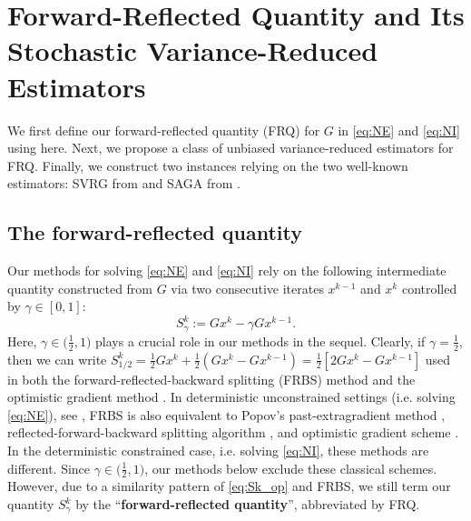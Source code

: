 \documentclass{article}
\newcommand{\beforesec}{\vspace{-1.5ex}}
\newcommand{\aftersec}{\vspace{-1.25ex}}
\newcommand{\beforesubsec}{\vspace{-1.5ex}}
\newcommand{\aftersubsec}{\vspace{-1.5ex}}
\theoremstyle{plain}
\theoremstyle{definition}
\theoremstyle{remark}
\begin{document}
\beforesec
\section{Forward-Reflected Quantity and Its Stochastic Variance-Reduced Estimators}\label{sec:VRS_Estimator}
\aftersec
We first define our forward-reflected quantity (FRQ) for $G$ in \eqref{eq:NE} and \eqref{eq:NI} using here. 
Next, we propose a class of unbiased variance-reduced estimators for FRQ.
Finally, we construct two instances relying on the two well-known estimators: SVRG from \cite{SVRG} and SAGA from \cite{Defazio2014}.

\beforesubsec
\subsection{The forward-reflected quantity}\label{subsec:OG_operator}
\aftersubsec
Our methods for solving \eqref{eq:NE} and \eqref{eq:NI} rely on the following intermediate quantity constructed from $G$ via two consecutive iterates $x^{k-1}$ and $x^k$ controlled by $\gamma \in [0, 1]$:
\begin{equation}\label{eq:Sk_op}
S_{\gamma}^k := Gx^k  - \gamma Gx^{k-1}.
\tag{FRQ}
\end{equation}
Here, $\gamma \in \big(\frac{1}{2}, 1\big)$ plays a crucial role in our methods in the sequel.
Clearly, if $\gamma = \frac{1}{2}$, then we can write $S_{1/2}^k = \frac{1}{2}Gx^k + \frac{1}{2}(Gx^k - Gx^{k-1}) = \frac{1}{2}[ 2Gx^k - Gx^{k-1}]$ used in both the forward-reflected-backward splitting (FRBS) method \citep{malitsky2020forward} and the optimistic gradient method  \citep{daskalakis2018training}.
In deterministic unconstrained settings (i.e. solving \eqref{eq:NE}), see \citep{tran2023sublinear}, FRBS  is also equivalent to Popov's past-extragradient method \citep{popov1980modification}, reflected-forward-backward splitting algorithm  \citep{cevher2021reflected,malitsky2015projected}, and optimistic gradient scheme \citep{daskalakis2018training}.
In the deterministic constrained case, i.e. solving \eqref{eq:NI}, these methods are different.
Since $\gamma \in \big(\frac{1}{2}, 1\big)$, our methods below exclude these classical schemes.
However, due to a similarity pattern of \eqref{eq:Sk_op} and  FRBS, we still term our quantity  $S_{\gamma}^k$ by the ``\textbf{forward-reflected quantity}'', abbreviated by FRQ.
\end{document}
